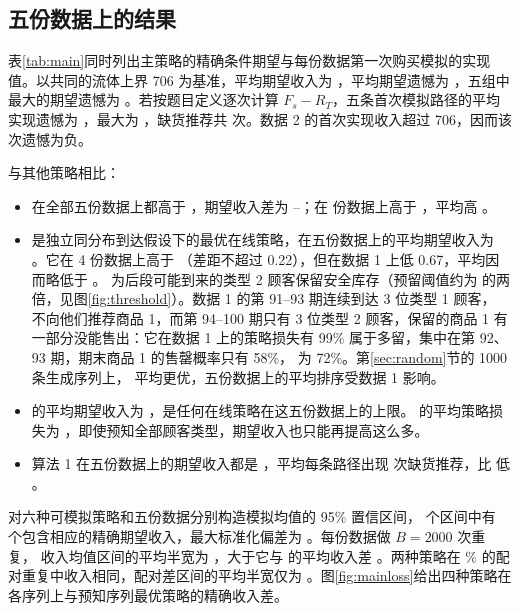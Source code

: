 \subsection{五份数据上的结果}\label{sec:main}
表\ref{tab:main}同时列出主策略的精确条件期望与每份数据第一次购买模拟的实现值。以共同的流体上界 706 为基准，平均期望收入为 \ERDual{}，平均期望遗憾为 \GavgDual{}，五组中最大的期望遗憾为 \GmaxDual。若按题目定义逐次计算 $F_s-R_T$，五条首次模拟路径的平均实现遗憾为 \FirstMeanRegret{}，最大为 \FirstMaxRegret{}，缺货推荐共 \FirstOosSlots{} 次。数据 2 的首次实现收入超过 706，因而该次遗憾为负。




与其他策略相比：
\begin{itemize}
\item \LPDual{} 在全部五份数据上都高于 \Greedy{}，期望收入差为 \DualGreedyMin--\DualGreedyMax；在 \DualFDWins{} 份数据上高于 \LPFD{}，平均高 \DualFDAvg。
\item \IIDDP{} 是独立同分布到达假设下的最优在线策略，在五份数据上的平均期望收入为 \ERIID{}。它在 4 份数据上高于 \LPDual{}（差距不超过 0.22），但在数据 1 上低 0.67，平均因而略低于 \LPDual{}。\IIDDP{} 为后段可能到来的类型 2 顾客保留安全库存（预留阈值约为 \LPDual{} 的两倍，见图\ref{fig:threshold}）。数据 1 的第 91--93 期连续到达 3 位类型 1 顾客，\IIDDP{} 不向他们推荐商品 1，而第 94--100 期只有 3 位类型 2 顾客，保留的商品 1 有一部分没能售出：它在数据 1 上的策略损失有 99\% 属于多留，集中在第 92、93 期，期末商品 1 的售罄概率只有 58\%，\SeqDP{} 为 72\%。第\ref{sec:random}节的 1000 条生成序列上，\IIDDP{} 平均更优，五份数据上的平均排序受数据 1 影响。
\item \SeqDP{} 的平均期望收入为 \ERSeq，是任何在线策略在这五份数据上的上限。\LPDual{} 的平均策略损失为 \LavgDual，即使预知全部顾客类型，期望收入也只能再提高这么多。
\item 算法 1 在五份数据上的期望收入都是 \AlgOneER{}，平均每条路径出现 \AlgOneOOS{} 次缺货推荐，比 \Greedy{} 低 \AlgOneLossGreedy。
\end{itemize}

对六种可模拟策略和五份数据分别构造模拟均值的 95\% 置信区间，\MCtotal{} 个区间中有 \MCinside{} 个包含相应的精确期望收入，最大标准化偏差为 \MCmaxZ。每份数据做 $B=2000$ 次重复，\LPDual{} 收入均值区间的平均半宽为 \MChw{}，大于它与 \Greedy{} 的平均收入差 \DualGreedyAvg。两种策略在 \MCpairEqual\% 的配对重复中收入相同，配对差区间的平均半宽仅为 \MCpairhw。图\ref{fig:mainloss}给出四种策略在各序列上与预知序列最优策略的精确收入差。

